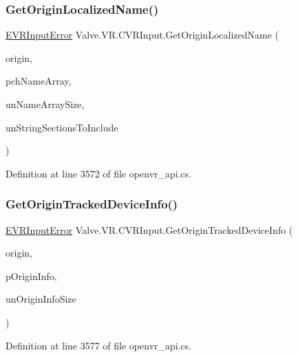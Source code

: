 \subsubsection{\texorpdfstring{GetOriginLocalizedName()}{GetOriginLocalizedName()}}
{\footnotesize\ttfamily \mbox{\hyperlink{namespace_valve_1_1_v_r_a592d7f4189b8346d6c96dbdbaa35bc1b}{E\+V\+R\+Input\+Error}} Valve.\+V\+R.\+C\+V\+R\+Input.\+Get\+Origin\+Localized\+Name (\begin{DoxyParamCaption}\item[{ulong}]{origin,  }\item[{System.\+Text.\+String\+Builder}]{pch\+Name\+Array,  }\item[{uint}]{un\+Name\+Array\+Size,  }\item[{int}]{un\+String\+Sections\+To\+Include }\end{DoxyParamCaption})}



Definition at line 3572 of file openvr\+\_\+api.\+cs.

\mbox{\label{class_valve_1_1_v_r_1_1_c_v_r_input_ad5e2114c76544ba963f7cf40a9a03d2b}} 
\subsubsection{\texorpdfstring{GetOriginTrackedDeviceInfo()}{GetOriginTrackedDeviceInfo()}}
{\footnotesize\ttfamily \mbox{\hyperlink{namespace_valve_1_1_v_r_a592d7f4189b8346d6c96dbdbaa35bc1b}{E\+V\+R\+Input\+Error}} Valve.\+V\+R.\+C\+V\+R\+Input.\+Get\+Origin\+Tracked\+Device\+Info (\begin{DoxyParamCaption}\item[{ulong}]{origin,  }\item[{ref \mbox{\hyperlink{struct_valve_1_1_v_r_1_1_input_origin_info__t}{Input\+Origin\+Info\+\_\+t}}}]{p\+Origin\+Info,  }\item[{uint}]{un\+Origin\+Info\+Size }\end{DoxyParamCaption})}



Definition at line 3577 of file openvr\+\_\+api.\+cs.

\mbox{\label{class_valve_1_1_v_r_1_1_c_v_r_input_a24ab4067a314b30cfa4a197da5000635}} 
